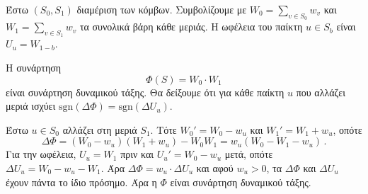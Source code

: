 Έστω $(S_0, S_1)$ διαμέριση των κόμβων. Συμβολίζουμε με
$W_0 = \sum_{v \in S_0} w_v$ και $W_1 = \sum_{v \in S_1} w_v$ τα συνολικά βάρη
κάθε μεριάς. Η ωφέλεια του παίκτη $u \in S_b$ είναι $U_u = W_{1-b}$.

Η συνάρτηση
$$
  \Phi(S) = W_0 \cdot W_1
$$
είναι συνάρτηση δυναμικού τάξης. Θα δείξουμε ότι για κάθε παίκτη $u$ που αλλάζει
μεριά ισχύει $\mathrm{sgn}(\Delta\Phi) = \mathrm{sgn}(\Delta U_u)$.

Έστω $u \in S_0$ αλλάζει στη μεριά $S_1$. Τότε $W_0' = W_0 - w_u$ και
$W_1' = W_1 + w_u$, οπότε
$$
  \Delta\Phi = (W_0 - w_u)(W_1 + w_u) - W_0 W_1 = w_u(W_0 - W_1 - w_u) \,.
$$
Για την ωφέλεια, $U_u = W_1$ πριν και $U_u' = W_0 - w_u$ μετά, οπότε
$\Delta U_u = W_0 - w_u - W_1$. Άρα $\Delta\Phi = w_u \cdot \Delta U_u$ και αφού
$w_u > 0$, τα $\Delta\Phi$ και $\Delta U_u$ έχουν πάντα το ίδιο πρόσημο. Άρα
η $\Phi$ είναι συνάρτηση δυναμικού τάξης.
